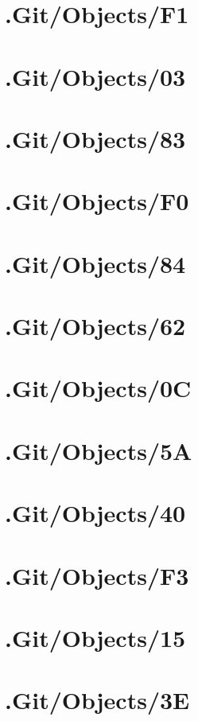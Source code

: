 \section*{.Git/Objects/F1}

\section*{.Git/Objects/03}

\section*{.Git/Objects/83}

\section*{.Git/Objects/F0}

\section*{.Git/Objects/84}

\section*{.Git/Objects/62}

\section*{.Git/Objects/0C}

\section*{.Git/Objects/5A}

\section*{.Git/Objects/40}

\section*{.Git/Objects/F3}

\section*{.Git/Objects/15}

\section*{.Git/Objects/3E}

